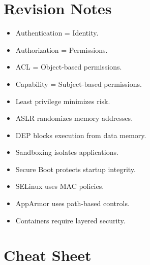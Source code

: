 \section{Revision Notes}

\begin{itemize}
\item Authentication = Identity.
\item Authorization = Permissions.
\item ACL = Object-based permissions.
\item Capability = Subject-based permissions.
\item Least privilege minimizes risk.
\item ASLR randomizes memory addresses.
\item DEP blocks execution from data memory.
\item Sandboxing isolates applications.
\item Secure Boot protects startup integrity.
\item SELinux uses MAC policies.
\item AppArmor uses path-based controls.
\item Containers require layered security.
\end{itemize}

\section{Cheat Sheet}

